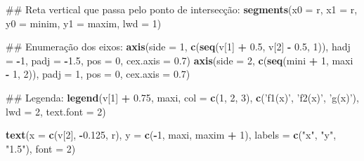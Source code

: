 \documentclass[]{book}
\newenvironment{Shaded}{\begin{snugshade}}{\end{snugshade}}
\newcommand{\KeywordTok}[1]{\textcolor[rgb]{0.13,0.29,0.53}{\textbf{#1}}}
\newcommand{\DataTypeTok}[1]{\textcolor[rgb]{0.13,0.29,0.53}{#1}}
\newcommand{\DecValTok}[1]{\textcolor[rgb]{0.00,0.00,0.81}{#1}}
\newcommand{\FloatTok}[1]{\textcolor[rgb]{0.00,0.00,0.81}{#1}}
\newcommand{\StringTok}[1]{\textcolor[rgb]{0.31,0.60,0.02}{#1}}
\newcommand{\OperatorTok}[1]{\textcolor[rgb]{0.81,0.36,0.00}{\textbf{#1}}}
\newcommand{\NormalTok}[1]{#1}
\begin{document}
\begin{enumerate}
\begin{Shaded}
\begin{Highlighting}[]
\NormalTok{##  Reta vertical que passa pelo ponto de intersecção:}
\KeywordTok{segments}\NormalTok{(}\DataTypeTok{x0 =}\NormalTok{ r, }\DataTypeTok{x1 =}\NormalTok{ r,}
     \DataTypeTok{y0 =}\NormalTok{ minim, }\DataTypeTok{y1 =}\NormalTok{ maxim, }\DataTypeTok{lwd =} \DecValTok{1}\NormalTok{)}

\NormalTok{##  Enumeração dos eixos:}
\KeywordTok{axis}\NormalTok{(}\DataTypeTok{side =} \DecValTok{1}\NormalTok{, }\KeywordTok{c}\NormalTok{(}\KeywordTok{seq}\NormalTok{(v[}\DecValTok{1}\NormalTok{] }\OperatorTok{+}\StringTok{ }\FloatTok{0.5}\NormalTok{, v[}\DecValTok{2}\NormalTok{] }\OperatorTok{-}\StringTok{ }\FloatTok{0.5}\NormalTok{, }\DecValTok{1}\NormalTok{)),}
 \DataTypeTok{hadj =} \OperatorTok{-}\DecValTok{1}\NormalTok{, }\DataTypeTok{padj =} \OperatorTok{-}\FloatTok{1.5}\NormalTok{, }\DataTypeTok{pos =} \DecValTok{0}\NormalTok{,  }\DataTypeTok{cex.axis =} \FloatTok{0.7}\NormalTok{)}
\KeywordTok{axis}\NormalTok{(}\DataTypeTok{side =} \DecValTok{2}\NormalTok{, }\KeywordTok{c}\NormalTok{(}\KeywordTok{seq}\NormalTok{(mini }\OperatorTok{+}\StringTok{ }\DecValTok{1}\NormalTok{, maxi }\OperatorTok{-}\StringTok{ }\DecValTok{1}\NormalTok{, }\DecValTok{2}\NormalTok{)),}
 \DataTypeTok{padj =} \DecValTok{1}\NormalTok{, }\DataTypeTok{pos =} \DecValTok{0}\NormalTok{,  }\DataTypeTok{cex.axis =} \FloatTok{0.7}\NormalTok{)}

\NormalTok{##  Legenda:}
\KeywordTok{legend}\NormalTok{(v[}\DecValTok{1}\NormalTok{] }\OperatorTok{+}\StringTok{ }\FloatTok{0.75}\NormalTok{, maxi, }\DataTypeTok{col =} \KeywordTok{c}\NormalTok{(}\DecValTok{1}\NormalTok{, }\DecValTok{2}\NormalTok{, }\DecValTok{3}\NormalTok{), }\KeywordTok{c}\NormalTok{(}\StringTok{'f1(x)'}\NormalTok{, }\StringTok{'f2(x)'}\NormalTok{, }\StringTok{'g(x)'}\NormalTok{),}
   \DataTypeTok{lwd =} \DecValTok{2}\NormalTok{, }\DataTypeTok{text.font =} \DecValTok{2}\NormalTok{)}

\KeywordTok{text}\NormalTok{(}\DataTypeTok{x =} \KeywordTok{c}\NormalTok{(v[}\DecValTok{2}\NormalTok{], }\OperatorTok{-}\FloatTok{0.125}\NormalTok{, r), }\DataTypeTok{y =} \KeywordTok{c}\NormalTok{(}\OperatorTok{-}\DecValTok{1}\NormalTok{, maxi, maxim }\OperatorTok{+}\StringTok{ }\DecValTok{1}\NormalTok{),}
 \DataTypeTok{labels =} \KeywordTok{c}\NormalTok{(}\StringTok{"x"}\NormalTok{, }\StringTok{"y"}\NormalTok{, }\StringTok{"1.5"}\NormalTok{), }\DataTypeTok{font =} \DecValTok{2}\NormalTok{)}
\end{Highlighting}
\end{Shaded}


\end{enumerate}
\end{document}
